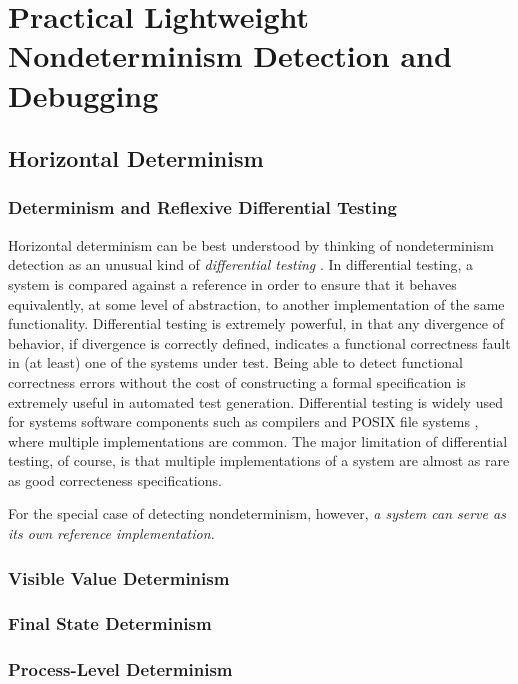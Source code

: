 \section{Practical Lightweight Nondeterminism
  Detection and Debugging}



\subsection{Horizontal Determinism}

\subsubsection{Determinism and Reflexive Differential Testing}

Horizontal determinism can be best understood by thinking of
nondeterminism detection as an unusual kind of \emph{differential
  testing} \cite{Differential,ICSEDiff}.  In differential testing, a
system is compared against a reference in order to ensure that
it behaves equivalently, at some level of abstraction, to another
implementation of the same functionality.  Differential testing is
extremely powerful, in that any divergence of behavior, if divergence
is correctly defined, indicates a functional correctness fault in (at
least) one of the systems under test.  Being able to detect functional
correctness errors without the cost of constructing a formal
specification is extremely useful in automated test generation.  Differential testing is widely
used for systems software components such as compilers
\cite{Differential,csmith} and POSIX file systems \cite{CFV08,AMAI}, where multiple
implementations are common.  The major limitation of differential
testing, of course, is that multiple implementations of a system are
almost as rare as good correcteness specifications.

For the special case of detecting nondeterminism, however, \emph{a
  system can serve as its own reference implementation.}  

\subsubsection{Visible Value Determinism}

\subsubsection{Final State Determinism}

\subsubsection{Process-Level Determinism}

